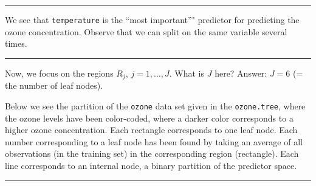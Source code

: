 \documentclass[]{article}
\newenvironment{Shaded}{\begin{snugshade}}{\end{snugshade}}
\newcommand{\CommentTok}[1]{\textcolor[rgb]{0.56,0.35,0.01}{\textit{#1}}}
\newcommand{\DataTypeTok}[1]{\textcolor[rgb]{0.13,0.29,0.53}{#1}}
\newcommand{\DecValTok}[1]{\textcolor[rgb]{0.00,0.00,0.81}{#1}}
\newcommand{\FloatTok}[1]{\textcolor[rgb]{0.00,0.00,0.81}{#1}}
\newcommand{\KeywordTok}[1]{\textcolor[rgb]{0.13,0.29,0.53}{\textbf{#1}}}
\newcommand{\NormalTok}[1]{#1}
\newcommand{\OperatorTok}[1]{\textcolor[rgb]{0.81,0.36,0.00}{\textbf{#1}}}
\newcommand{\OtherTok}[1]{\textcolor[rgb]{0.56,0.35,0.01}{#1}}
\newcommand{\StringTok}[1]{\textcolor[rgb]{0.31,0.60,0.02}{#1}}
\begin{document}
\normalsize

\begin{center}\rule{0.5\linewidth}{\linethickness}\end{center}

We see that \texttt{temperature} is the ``most important''" predictor
for predicting the ozone concentration. Observe that we can split on the
same variable several times.

\begin{center}\rule{0.5\linewidth}{\linethickness}\end{center}

Now, we focus on the regions \(R_j\), \(j=1,\ldots, J\). What is \(J\)
here? Answer: \(J=6\) (= the number of leaf nodes).

Below we see the partition of the \texttt{ozone} data set given in the
\texttt{ozone.tree}, where the ozone levels have been color-coded, where
a darker color corresponds to a higher ozone concentration. Each
rectangle corresponds to one leaf node. Each number corresponding to a
leaf node has been found by taking an average of all observations (in
the training set) in the corresponding region (rectangle). Each line
corresponds to an internal node, a binary partition of the predictor
space.

\begin{center}\rule{0.5\linewidth}{\linethickness}\end{center}

\begin{Shaded}
\end{Shaded}
\end{document}

